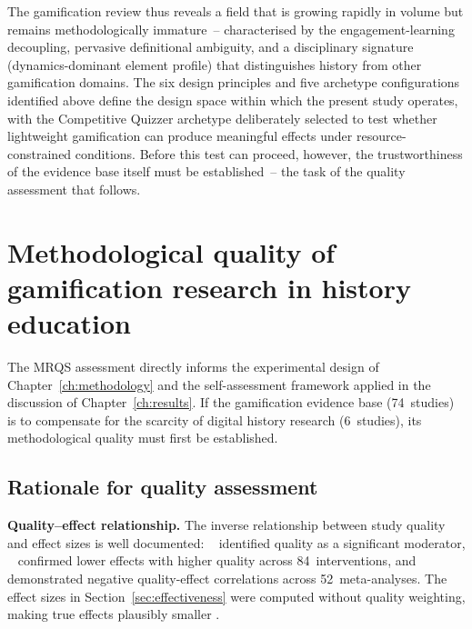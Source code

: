 
The gamification review thus reveals a field that is growing rapidly in volume but remains methodologically immature~-- characterised by the engagement-learning decoupling, pervasive definitional ambiguity, and a disciplinary signature (dynamics-dominant element profile) that distinguishes history from other gamification domains. The six design principles and five archetype configurations identified above define the design space within which the present study operates, with the Competitive Quizzer archetype deliberately selected to test whether lightweight gamification can produce meaningful effects under resource-constrained conditions. Before this test can proceed, however, the trustworthiness of the evidence base itself must be established~-- the task of the quality assessment that follows.


\section{Methodological quality of gamification research in history education} \label{sec:mrqs}

The MRQS assessment directly informs the experimental design of Chapter~\ref{ch:methodology} and the self-assessment framework applied in the discussion of Chapter~\ref{ch:results}. If the gamification evidence base (74~studies) is to compensate for the scarcity of digital history research (6~studies), its methodological quality must first be established.

\subsection{Rationale for quality assessment}

\textbf{Quality--effect relationship.} The inverse relationship between study quality and effect sizes is well documented: \citeauthor{Hattie2009}~\cite{Hattie2009} identified quality as a significant moderator, \citeauthor{CheungSlavin2012}~\cite{CheungSlavin2012} confirmed lower effects with higher quality across 84~interventions, and \citeauthor{TamimMMRQG2021}~\cite{TamimMMRQG2021} demonstrated negative quality-effect correlations across 52~meta-analyses. The effect sizes in Section~\ref{sec:effectiveness} were computed without quality weighting, making true effects plausibly smaller \cite{Kraft2020}.

